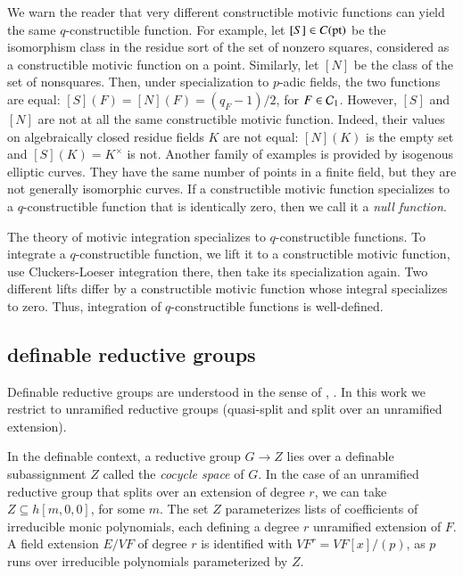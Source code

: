 We warn the reader that very different constructible motivic functions
can yield the same $q$-constructible function.  For example, let
$[S]\in C({\operatorname{pt}})$ be the isomorphism class in the residue sort of
the set of nonzero squares, considered as a constructible motivic
function on a point.  Similarly, let $[N]$ be the class of the set of
nonsquares.  Then, under specialization to $p$-adic fields, the two
functions are equal: $[S](F) = [N](F) = (q_F-1)/2$, for
$F\in\mathcal C_1$. However, $[S]$ and $[N]$ are not at all the same
constructible motivic function. Indeed, their values on algebraically
closed residue fields $K$ are not equal: $[N](K)$ is the empty set and
$[S](K) = K^\times$ is not.  Another family of examples is provided by
isogenous elliptic curves.  They have the same number of points in a
finite field, but they are not generally isomorphic curves.  If a
constructible motivic function specializes to a $q$-constructible
function that is identically zero, then we call it a {\it null function}.

The theory of motivic integration specializes to $q$-constructible
functions. To integrate a $q$-constructible function, we lift it
to a constructible motivic function, use Cluckers-Loeser integration
there, then take its specialization again.  Two different lifts differ
by a constructible motivic function whose integral specializes to
zero. Thus, integration of $q$-constructible functions is well-defined.

\subsection{definable reductive groups}\label{sec:defred}

Definable reductive groups are understood in the sense of
\cite{cluckers2011transfer}, \cite{gordon}.  In this work we restrict
to unramified reductive groups (quasi-split and split over an
unramified extension).

In the definable context, a reductive group $G\to Z$ lies over a
definable subassignment $Z$ called the {\it cocycle space} of $G$.  In
the case of an unramified reductive group that splits over an
extension of degree $r$, we can take $Z\subseteq h[m,0,0]$, for some
$m$.  The set $Z$ parameterizes lists of coefficients of irreducible
monic polynomials, each defining a degree $r$ unramified extension of
$F$.  A field extension $E/VF$ of degree $r$ is identified with $VF^r
= VF[x]/(p)$, as $p$ runs over irreducible polynomials parameterized
by $Z$.

